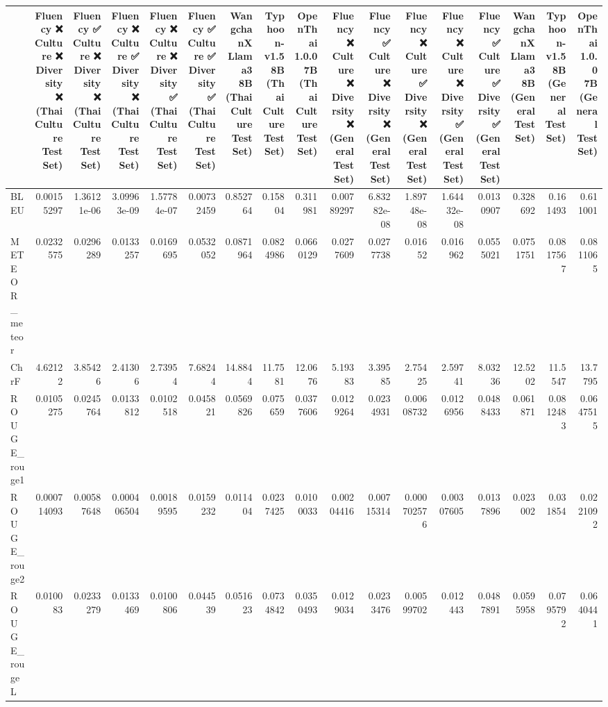 \begin{tabular}{lrrrrrrrrrrrrrrrr}
\hline
                 &             Fluency ❌
 Culture ❌
 Diversity ❌
(Thai Culture Test Set) &             Fluency ✅
 Culture ❌
 Diversity ❌
(Thai Culture Test Set) &             Fluency ❌
 Culture ✅
 Diversity ❌
(Thai Culture Test Set) &             Fluency ❌
 Culture ❌
 Diversity ✅
(Thai Culture Test Set) &            Fluency ✅
 Culture ✅
 Diversity ✅
(Thai Culture Test Set) &            WangchanX Llama3 8B
(Thai Culture Test Set) &            Typhoon-v1.5 8B
(Thai Culture Test Set) &            OpenThai 1.0.0 7B
(Thai Culture Test Set) &            Fluency ❌
 Culture ❌
 Diversity ❌
(General Test Set) &             Fluency ✅
 Culture ❌
 Diversity ❌
(General Test Set) &             Fluency ❌
 Culture ✅
 Diversity ❌
(General Test Set) &             Fluency ❌
 Culture ❌
 Diversity ✅
(General Test Set) &           Fluency ✅
 Culture ✅
 Diversity ✅
(General Test Set) &            WangchanX Llama3 8B
(General Test Set) &            Typhoon-v1.5 8B
(General Test Set) &            OpenThai 1.0.0 7B
(General Test Set) \\
\hline
 BLEU            & 0.00155297  & 1.36121e-06 & 3.09963e-09 & 1.57784e-07 & 0.00732459 &  0.852764  &  0.15804   &  0.311981  & 0.00789297 & 6.83282e-08 & 1.89748e-08 & 1.64432e-08 & 0.0130907 &  0.328692  &  0.161493  &  0.611001  \\
 METEOR_meteor   & 0.0232575   & 0.0296289   & 0.0133257   & 0.0169695   & 0.0532052  &  0.0871964 &  0.0824986 &  0.0660129 & 0.0277609  & 0.0277738   & 0.01652     & 0.016962    & 0.0555021 &  0.0751751 &  0.0817567 &  0.0811065 \\
 ChrF            & 4.62122     & 3.85426     & 2.41306     & 2.73954     & 7.68244    & 14.8844    & 11.7581    & 12.0676    & 5.19383    & 3.39585     & 2.75425     & 2.59741     & 8.03236   & 12.5202    & 11.5547    & 13.7795    \\
 ROUGE_rouge1    & 0.0105275   & 0.0245764   & 0.0133812   & 0.0102518   & 0.045821   &  0.0569826 &  0.075659  &  0.0377606 & 0.0129264  & 0.0234931   & 0.00608732  & 0.0126956   & 0.0488433 &  0.061871  &  0.0812483 &  0.0647515 \\
 ROUGE_rouge2    & 0.000714093 & 0.00587648  & 0.000406504 & 0.00189595  & 0.0159232  &  0.011404  &  0.0237425 &  0.0100033 & 0.00204416 & 0.00715314  & 0.000702576 & 0.00307605  & 0.0137896 &  0.023002  &  0.031854  &  0.0221092 \\
 ROUGE_rougeL    & 0.010083    & 0.0233279   & 0.0133469   & 0.0100806   & 0.044539   &  0.051623  &  0.0734842 &  0.0350493 & 0.0129034  & 0.0233476   & 0.00599702  & 0.012443    & 0.0487891 &  0.0595958 &  0.0795792 &  0.0640441 \\

\end{tabular}
